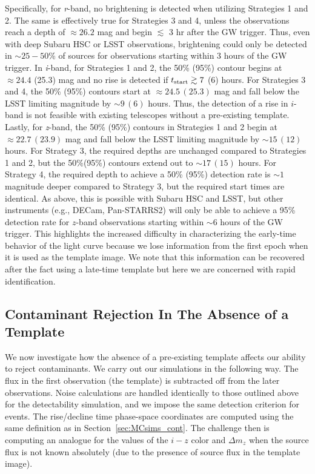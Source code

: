 Specifically, for {\em r}-band, no brightening is detected when utilizing Strategies 1 and 2. The same is effectively true for Strategies 3 and 4, unless the observations reach a depth of $\approx 26.2$ mag and begin $\lesssim$ 3 hr after the GW trigger. Thus, even with deep Subaru HSC or LSST observations, brightening could only be detected in $\sim25-50$\% of sources for observations starting within 3 hours of the GW trigger. In {\em i}-band, for Strategies 1 and 2, the 50\% (95\%) contour begins at $\approx 24.4$ (25.3) mag and no rise is detected if $t_{{\rm start}} \gtrsim 7$ (6) hours. For Strategies 3 and 4, the 50\% (95\%) contours start at $\approx 24.5\,(25.3)$ mag and fall below the LSST limiting magnitude by $\sim 9\,(6)$ hours. Thus, the detection of a rise in $i$-band is not feasible with existing telescopes without a pre-existing template. Lastly, for {\em z}-band, the 50\% (95\%) contours in Strategies 1 and 2 begin at $\approx 22.7\,(23.9)$ mag and fall below the LSST limiting magnitude by $\sim 15\,(12)$ hours. For Strategy 3, the required depths are unchanged compared to Strategies 1 and 2, but the 50\%(95\%) contours extend out to $\sim 17\,(15)$ hours. For Strategy 4, the required depth to achieve a 50\% (95\%) detection rate is $\sim 1$ magnitude deeper compared to Strategy 3, but the required start times are identical. As above, this is possible with Subaru HSC and LSST, but other instruments (e.g., DECam, Pan-STARRS2) will only be able to achieve a 95\% detection rate for $z$-band observations starting within $\sim6$ hours of the GW trigger. This highlights the increased difficulty in characterizing the early-time behavior of the light curve because we lose information from the first epoch when it is used as the template image. We note that this information can be recovered after the fact using a late-time template but here we are concerned with rapid identification.

\subsection{Contaminant Rejection In The Absence of a Template}
We now investigate how the absence of a pre-existing template affects our ability to reject contaminants. We carry out our simulations in the following way. The flux in the first observation (the template) is subtracted off from the later observations. Noise calculations are handled identically to those outlined above for the detectability simulation, and we impose the same detection criterion for events. The rise/decline time phase-space coordinates are computed using the same definition as in Section~\ref{sec:MCsims_cont}. The challenge then is computing an analogue for the values of the $i-z$ color and $\Delta m_z$ when the source flux is not known absolutely (due to the presence of source flux in the template image). 


